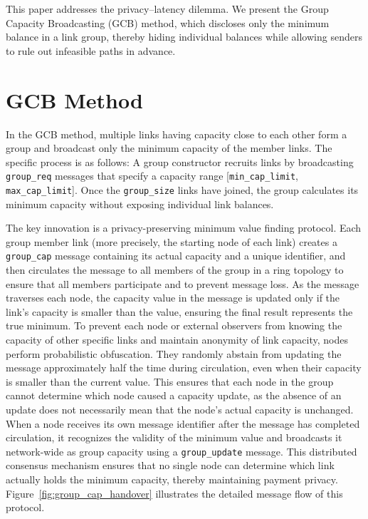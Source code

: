 \documentclass[conference]{IEEEtran}
\newcommand{\groupcap}{\texttt{group\_cap}}
\newcommand{\groupupdate}{\texttt{group\_update}}
\newcommand{\groupreq}{\texttt{group\_req}}
\newcommand{\groupsize}{\texttt{group\_size}}
\newcommand{\mincaplimit}{\texttt{min\_cap\_limit}}
\newcommand{\maxcaplimit}{\texttt{max\_cap\_limit}}
\begin{document}
This paper addresses the privacy–latency dilemma.
We present the Group Capacity Broadcasting (GCB) method, which discloses only the minimum balance in a link group, thereby hiding individual balances while allowing senders to rule out infeasible paths in advance.

\section{GCB Method}

In the GCB method, multiple links having capacity close to each other form a group and broadcast only the minimum capacity of the member links.
The specific process is as follows:
A group constructor recruits links by broadcasting \groupreq{} messages that specify a capacity range [\mincaplimit{}, \maxcaplimit{}].
Once the \groupsize{} links have joined, the group calculates its minimum capacity without exposing individual link balances.

The key innovation is a privacy-preserving minimum value finding protocol.
Each group member link (more precisely, the starting node of each link) creates a \groupcap{} message containing its actual capacity and a unique identifier, and then circulates the message to all members of the group in a ring topology to ensure that all members participate and to prevent message loss.
As the message traverses each node, the capacity value in the message is updated only if the link's capacity is smaller than the value, ensuring the final result represents the true minimum.
To prevent each node or external observers from knowing the capacity of other specific links and maintain anonymity of link capacity, nodes perform probabilistic obfuscation.
They randomly abstain from updating the message approximately half the time during circulation, even when their capacity is smaller than the current value.
This ensures that each node in the group cannot determine which node caused a capacity update, as the absence of an update does not necessarily mean that the node's actual capacity is unchanged.
When a node receives its own message identifier after the message has completed circulation, it recognizes the validity of the minimum value and broadcasts it network-wide as group capacity using a \groupupdate{} message.
This distributed consensus mechanism ensures that no single node can determine which link actually holds the minimum capacity, thereby maintaining payment privacy.
Figure~\ref{fig:group_cap_handover} illustrates the detailed message flow of this protocol.
\end{document}
